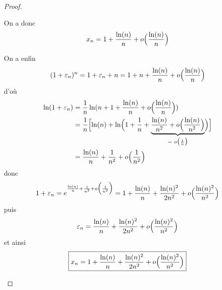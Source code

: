 \begin{proof}
\begin{enumerate}
		On a donc 
		$$x_{n}=1+\frac{\ln(n)}{n}+o\Bigl(\frac{\ln(n)}{n}\Bigr)$$

		On a enfin 
		$$(1+\varepsilon_{n})^{n}=1+\varepsilon_{n}+n=1+n+\frac{\ln(n)}{n}+o\Bigl(\frac{\ln(n)}{n}\Bigr)$$
		d'où
		\begin{align*}
			\ln(1+\varepsilon_{n})
			&=\frac{1}{n}\ln(n+1+\frac{\ln(n)}{n}+o\Bigl(\frac{\ln(n)}{n}\Bigr))\\
			&=\frac{1}{n}\Bigl[\ln(n)+\ln\Bigl(1+\frac{1}{n}+\underbrace{\frac{\ln(n)}{n^{2}}+o\Bigl(\frac{\ln(n)}{n^{2}}\Bigr)}_{=~o\bigl(\frac{1}{n}\bigr)}\Bigr)\Bigr]\\
			&=\frac{\ln(n)}{n}+\frac{1}{n^{2}}+o\Bigl(\frac{1}{n^{2}}\Bigr)
		\end{align*}
		donc 
		$$1+\varepsilon_{n}=e^{\frac{\ln(n)}{n}+\frac{1}{n^{2}}+o\Bigl(\frac{1}{n^{2}}\Bigr)}=1+\frac{\ln(n)}{n}+\frac{\ln(n)^{2}}{2n^{2}}+o\Bigl(\frac{\ln(n)^{2}}{n^{2}}\Bigr)$$
		puis
		$$\varepsilon_{n}=\frac{\ln(n)}{n}+\frac{\ln(n)^{2}}{2n^{2}}+o\Bigl(\frac{\ln(n)^{2}}{n^{2}}\Bigr)$$
		et ainsi
		$$\boxed{x_{n}=1+\frac{\ln(n)}{n}+\frac{\ln(n)^{2}}{2n^{2}}+o\Bigl(\frac{\ln(n)^{2}}{n^{2}}\Bigr)}$$
	\end{enumerate}
\end{proof}

